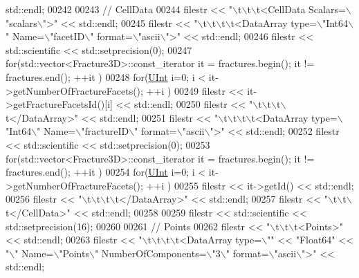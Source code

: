 \begin{DoxyCode}
      std::endl;
00242 
00243     \textcolor{comment}{// CellData}
00244     filestr << \textcolor{stringliteral}{"\(\backslash\)t\(\backslash\)t\(\backslash\)t<CellData Scalars=\(\backslash\)"scalars\(\backslash\)">"} << std::endl;
00245     filestr << \textcolor{stringliteral}{"\(\backslash\)t\(\backslash\)t\(\backslash\)t\(\backslash\)t<DataArray type=\(\backslash\)"Int64\(\backslash\)" Name=\(\backslash\)"facetID\(\backslash\)" format=\(\backslash\)"ascii\(\backslash\)">"} << std::endl;
00246     filestr << std::scientific << std::setprecision(0);
00247     \textcolor{keywordflow}{for}(std::vector<Fracture3D>::const\_iterator it = fractures.begin(); it != fractures.end(); ++it )
00248         \textcolor{keywordflow}{for}(\hyperlink{namespaceFVCode3D_a4bf7e328c75d0fd504050d040ebe9eda}{UInt} i=0; i < it->getNumberOfFractureFacets(); ++i )
00249             filestr << it->getFractureFacetsId()[i] << std::endl;
00250     filestr << \textcolor{stringliteral}{"\(\backslash\)t\(\backslash\)t\(\backslash\)t\(\backslash\)t</DataArray>"} << std::endl;
00251     filestr << \textcolor{stringliteral}{"\(\backslash\)t\(\backslash\)t\(\backslash\)t\(\backslash\)t<DataArray type=\(\backslash\)"Int64\(\backslash\)" Name=\(\backslash\)"fractureID\(\backslash\)" format=\(\backslash\)"ascii\(\backslash\)">"} << std::endl;
00252     filestr << std::scientific << std::setprecision(0);
00253     \textcolor{keywordflow}{for}(std::vector<Fracture3D>::const\_iterator it = fractures.begin(); it != fractures.end(); ++it )
00254         \textcolor{keywordflow}{for}(\hyperlink{namespaceFVCode3D_a4bf7e328c75d0fd504050d040ebe9eda}{UInt} i=0; i < it->getNumberOfFractureFacets(); ++i )
00255             filestr << it->getId() << std::endl;
00256     filestr << \textcolor{stringliteral}{"\(\backslash\)t\(\backslash\)t\(\backslash\)t\(\backslash\)t</DataArray>"} << std::endl;
00257     filestr << \textcolor{stringliteral}{"\(\backslash\)t\(\backslash\)t\(\backslash\)t</CellData>"} << std::endl;
00258 
00259     filestr << std::scientific << std::setprecision(16);
00260 
00261     \textcolor{comment}{// Points}
00262     filestr << \textcolor{stringliteral}{"\(\backslash\)t\(\backslash\)t\(\backslash\)t<Points>"} << std::endl;
00263     filestr << \textcolor{stringliteral}{"\(\backslash\)t\(\backslash\)t\(\backslash\)t\(\backslash\)t<DataArray type=\(\backslash\)""} << \textcolor{stringliteral}{"Float64"} << \textcolor{stringliteral}{"\(\backslash\)" Name=\(\backslash\)"Points\(\backslash\)" NumberOfComponents=\(\backslash\)"3\(\backslash\)"
       format=\(\backslash\)"ascii\(\backslash\)">"} << std::endl;

\end{DoxyCode}
